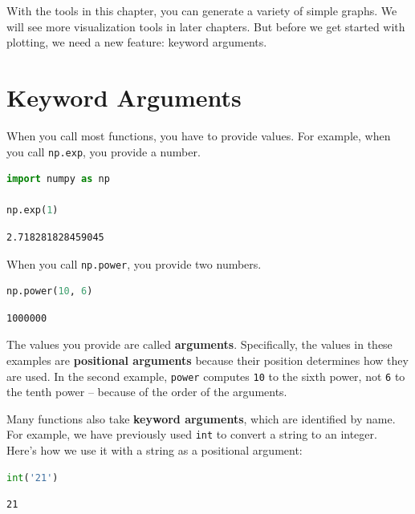 \documentclass[
]{book}
\newcommand{\passthrough}[1]{#1}
\begin{document}
With the tools in this chapter, you can generate a variety of simple
graphs. We will see more visualization tools in later chapters. But
before we get started with plotting, we need a new feature: keyword
arguments.

\section{Keyword Arguments}\label{keyword-arguments}

When you call most functions, you have to provide values. For example,
when you call \passthrough{\lstinline!np.exp!}, you provide a number.

\begin{lstlisting}[language=Python]
import numpy as np

np.exp(1)
\end{lstlisting}

\begin{lstlisting}
2.718281828459045
\end{lstlisting}

When you call \passthrough{\lstinline!np.power!}, you provide two
numbers.

\begin{lstlisting}[language=Python]
np.power(10, 6)
\end{lstlisting}

\begin{lstlisting}
1000000
\end{lstlisting}

The values you provide are called \textbf{arguments}. Specifically, the
values in these examples are \textbf{positional arguments} because their
position determines how they are used. In the second example,
\passthrough{\lstinline!power!} computes \passthrough{\lstinline!10!} to
the sixth power, not \passthrough{\lstinline!6!} to the tenth power --
because of the order of the arguments.

Many functions also take \textbf{keyword arguments}, which are
identified by name. For example, we have previously used
\passthrough{\lstinline!int!} to convert a string to an integer. Here's
how we use it with a string as a positional argument:

\begin{lstlisting}[language=Python]
int('21')
\end{lstlisting}

\begin{lstlisting}
21
\end{lstlisting}
\end{document}
